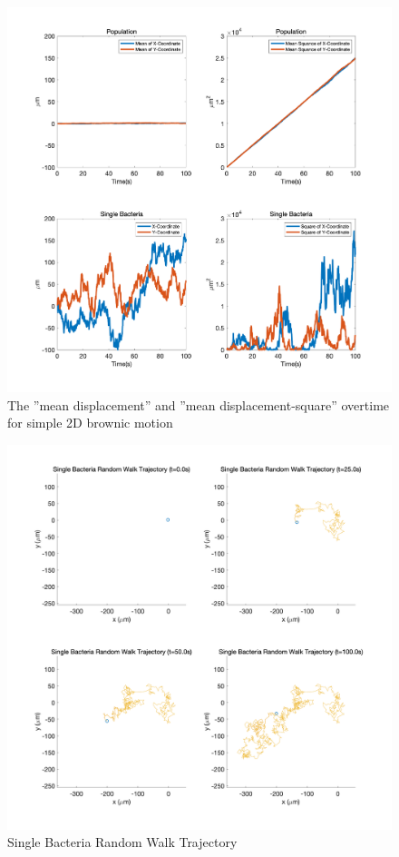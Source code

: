\begin{figure}[H]
\centering
\includegraphics[width=1\linewidth]{Figures/P1_fig2.png}
\caption{The ”mean displacement” and ”mean displacement-square” overtime for simple 2D brownic motion}
\label{P1_fig2}
\end{figure}


\begin{figure}[H]
\centering
\includegraphics[width=1\linewidth]{Figures/P1_fig3.png}
\caption{Single Bacteria Random Walk Trajectory}
\label{P1_fig2}
\end{figure}


